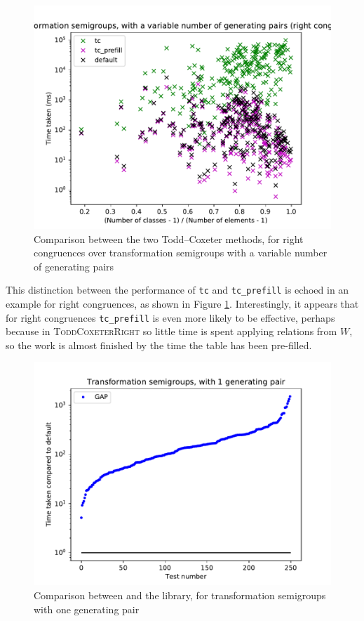 \begin{figure}[p]
  \centering
  \includegraphics[width=\textwidth]{pics/ch-pairs/bench-trans-tc-vp-right-bynrclasses}
  \caption[Benchmark: Todd--Coxeter, concrete, right, $n$ pairs]
  {Comparison between the two Todd--Coxeter methods, for right
    congruences over transformation semigroups with a variable number of
    generating pairs}
  \label{fig:bench-trans-tc-vp-right-bynrclasses}
\end{figure}

This distinction between the performance of \texttt{tc} and \texttt{tc\_prefill}
is echoed in an example for right congruences, as shown in Figure
\ref{fig:bench-trans-tc-vp-right-bynrclasses}.  Interestingly, it appears that
for right congruences \texttt{tc\_prefill} is even more likely to be effective,
perhaps because in \textsc{ToddCoxeterRight} so little time is spent applying
relations from $W$, so the work is almost finished by the time the table has
been pre-filled.

\begin{figure}[p]
  \centering
  \includegraphics[width=\textwidth]{pics/ch-pairs/bench-trans-1p-gap}
  \caption[Benchmark: \GAP{}/\libsemigroups{}, concrete, 1 pair]
  {Comparison between \libsemigroups{} and the \GAP{} library, for
    transformation semigroups with one generating pair}
  \label{fig:bench-trans-1p-gap}
\end{figure}

